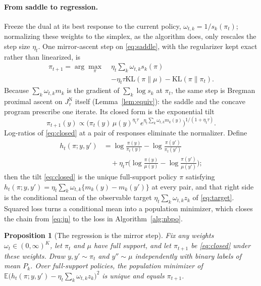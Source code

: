 \documentclass[letterpaper]{article} %
\newtheorem{proposition}{Proposition}
\newcommand{\KL}{\mathrm{KL}}
\newcommand{\E}{\mathbb{E}}
\begin{document}
\paragraph{From saddle to regression.}
Freeze the dual at its best response to the current policy, $\omega_{t,k}=1/s_k(\pi_t)$; normalizing these weights to the simplex, as the algorithm does, only rescales the step size $\eta_t$. One mirror-ascent step on \eqref{eq:saddle}, with the regularizer kept exact rather than linearized, is
\begin{equation}
\begin{aligned}
\pi_{t+1}=\arg\max_{\pi}\;&\eta_t\textstyle\sum_k\omega_{t,k}s_k(\pi)\\
&-\eta_t\tau\KL(\pi\|\mu)-\KL(\pi\|\pi_t).
\end{aligned}
\label{eq:md}
\end{equation}
Because $\sum_k\omega_{t,k}m_k$ is the gradient of $\sum_k\log s_k$ at $\pi_t$, the same step is Bregman proximal ascent on $J^{\mathrm N}_\tau$ itself (Lemma~\ref{lem:equiv}): the saddle and the concave program prescribe one iterate. Its closed form is the exponential tilt
\begin{equation}
\pi_{t+1}(y)\propto\Big(\pi_t(y)\,\mu(y)^{\eta_t\tau}\,e^{\eta_t\sum_k\omega_{t,k}m_k(y)}\Big)^{\!1/(1+\eta_t\tau)}.
\label{eq:closed}
\end{equation}
Log-ratios of \eqref{eq:closed} at a pair of responses eliminate the normalizer. Define
\begin{equation}
\begin{aligned}
h_t(\pi;y,y')&=\log\tfrac{\pi(y)}{\pi_t(y)}-\log\tfrac{\pi(y')}{\pi_t(y')}\\
&\quad+\eta_t\tau\Big(\log\tfrac{\pi(y)}{\mu(y)}-\log\tfrac{\pi(y')}{\mu(y')}\Big);
\end{aligned}
\label{eq:h}
\end{equation}
then the tilt \eqref{eq:closed} is the unique full-support policy $\pi$ satisfying $h_t(\pi;y,y')=\eta_t\sum_k\omega_{t,k}\{m_k(y)-m_k(y')\}$ at every pair, and that right side is the conditional mean of the observable target $\eta_t\sum_k\omega_{t,k}z_k$ of \eqref{eq:target}. Squared loss turns a conditional mean into a population minimizer, which closes the chain from \eqref{eq:jn} to the loss in Algorithm~\ref{alg:nbpo}.
\begin{proposition}[The regression is the mirror step]
\label{prop:exact}
Fix any weights $\omega_t\in(0,\infty)^K$, let $\pi_t$ and $\mu$ have full support, and let $\pi_{t+1}$ be \eqref{eq:closed} under these weights. Draw $y,y'\sim\pi_t$ and $y''\sim\mu$ independently with binary labels of mean $P_k$. Over full-support policies, the population minimizer of $\E\big(h_t(\pi;y,y')-\eta_t\sum_k\omega_{t,k}z_k\big)^2$ is unique and equals $\pi_{t+1}$.
\end{proposition}
\end{document}
